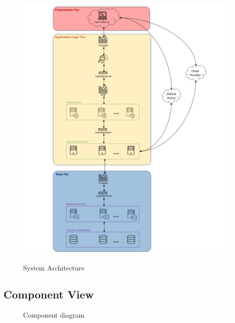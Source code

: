 \newpage

\begin{figure}[H]
    \centering
    {\includegraphics[width=1.2\linewidth]{Images/Architecture.png}}
    \caption{System Architecture}
    \label{fig:system_architecture}
\end{figure}

\newpage
 
\subsection{Component View}


\begin{figure}[H]
    \centering
    \caption{Component diagram}
    \label{fig:component_diagram}
\end{figure}


